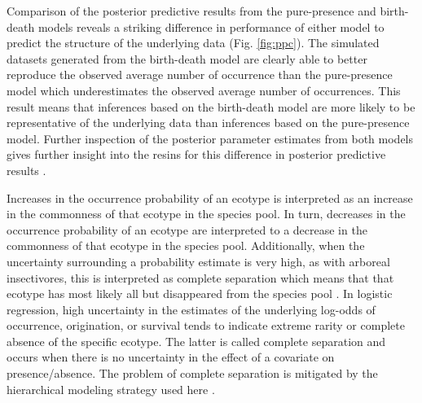 \documentclass[12pt,letterpaper]{article}
\begin{document}
Comparison of the posterior predictive results from the pure-presence and birth-death models reveals a striking difference in performance of either model to predict the structure of the underlying data (Fig. \ref{fig:ppc}). The simulated datasets generated from the birth-death model are clearly able to better reproduce the observed average number of occurrence than the pure-presence model which underestimates the observed average number of occurrences. This result means that inferences based on the birth-death model are more likely to be representative of the underlying data than inferences based on the pure-presence model. Further inspection of the posterior parameter estimates from both models gives further insight into the resins for this difference in posterior predictive results \citep{Gelman2013d}. 

Increases in the occurrence probability of an ecotype is interpreted as an increase in the commonness of that ecotype in the species pool. In turn, decreases in the occurrence probability of an ecotype are interpreted to a decrease in the commonness of that ecotype in the species pool. Additionally, when the uncertainty surrounding a probability estimate is very high, as with arboreal insectivores, this is interpreted as complete separation which means that that ecotype has most likely all but disappeared from the species pool \citep{Gelman2007}. In logistic regression, high uncertainty in the estimates of the underlying log-odds of occurrence, origination, or survival tends to indicate extreme rarity or complete absence of the specific ecotype. The latter is called complete separation and occurs when there is no uncertainty in the effect of a covariate on presence/absence. The problem of complete separation is mitigated by the hierarchical modeling strategy used here \citep{Gelman2013d,Gelman2007,McElreath2016}.
\end{document}
